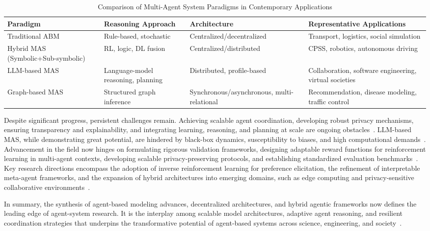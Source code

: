 \begin{table*}[htbp]
\centering
\caption{Comparison of Multi-Agent System Paradigms in Contemporary Applications}
\label{tab:mas_comparison}
\begin{adjustbox}{max width=\textwidth}
\begin{tabular}{@{}llll@{}}
\toprule
\textbf{Paradigm} & \textbf{Reasoning Approach} & \textbf{Architecture} & \textbf{Representative Applications} \\
\midrule
Traditional ABM & Rule-based, stochastic & Centralized/decentralized & Transport, logistics, social simulation \\
Hybrid MAS (Symbolic+Sub-symbolic) & RL, logic, DL fusion & Centralized/distributed & CPSS, robotics, autonomous driving \\
LLM-based MAS & Language-model reasoning, planning & Distributed, profile-based & Collaboration, software engineering, virtual societies \\
Graph-based MAS & Structured graph inference & Synchronous/asynchronous, multi-relational & Recommendation, disease modeling, traffic control \\
\bottomrule
\end{tabular}
\end{adjustbox}
\end{table*}

Despite significant progress, persistent challenges remain. Achieving scalable agent coordination, developing robust privacy mechanisms, ensuring transparency and explainability, and integrating learning, reasoning, and planning at scale are ongoing obstacles~\cite{ref101,ref104,ref103,ref105,ref106}. LLM-based MAS, while demonstrating great potential, are hindered by black-box dynamics, susceptibility to biases, and high computational demands~\cite{ref101,ref105}. Advancement in the field now hinges on formulating rigorous validation frameworks, designing adaptable reward functions for reinforcement learning in multi-agent contexts, developing scalable privacy-preserving protocols, and establishing standardized evaluation benchmarks~\cite{ref101,ref103,ref104,ref105,ref106,ref113,ref114,ref115}. Key research directions encompass the adoption of inverse reinforcement learning for preference elicitation, the refinement of interpretable meta-agent frameworks, and the expansion of hybrid architectures into emerging domains, such as edge computing and privacy-sensitive collaborative environments~\cite{ref103,ref104,ref105}.

In summary, the synthesis of agent-based modeling advances, decentralized architectures, and hybrid agentic frameworks now defines the leading edge of agent-system research. It is the interplay among scalable model architectures, adaptive agent reasoning, and resilient coordination strategies that underpins the transformative potential of agent-based systems across science, engineering, and society~\cite{ref13,ref22,ref25,ref26,ref27,ref41,ref42,ref43,ref44,ref54,ref55,ref56,ref60,ref69,ref70,ref83,ref85,ref101,ref103,ref104,ref105,ref106,ref112,ref113,ref114,ref115}.


